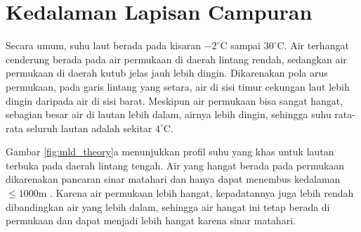 \section[Kedalaman Lapisan Campuran]{Kedalaman Lapisan Campuran}
\begin{spacing}{1.5}
	Secara umum, suhu laut berada pada kisaran $-2^\circ$C sampai $30^\circ$C. Air terhangat cenderung berada pada air permukaan di daerah lintang rendah, sedangkan air permukaan di daerah kutub jelas jauh lebih dingin. Dikarenakan pola arus permukaan, pada garis lintang yang setara, air di sisi timur cekungan laut lebih dingin daripada air di sisi barat. Meskipun air permukaan bisa sangat hangat, sebagian besar air di lautan lebih dalam, airnya lebih dingin, sehingga suhu rata-rata seluruh lautan adalah sekitar $4^\circ$C.
	
	Gambar \ref{fig:mld_theory}a menunjukkan profil suhu yang khas untuk lautan terbuka pada daerah lintang tengah. Air yang hangat berada pada permukaan dikarenakan pancaran sinar matahari dan hanya dapat menembus kedalaman $\leq 1000$m . Karena air permukaan lebih hangat, kepadatannya juga lebih rendah dibandingkan air yang lebih dalam, sehingga air hangat ini tetap berada di permukaan dan dapat menjadi lebih hangat karena sinar matahari. 
	

\end{spacing}
